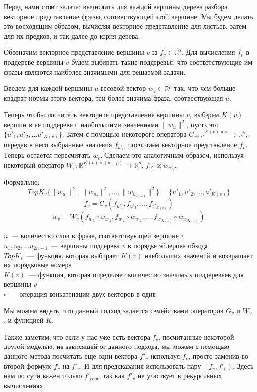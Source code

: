 Перед нами стоит задача: вычислить для каждой вершины дерева разбора 
векторное представление фразы, соотвествующей этой вершине.
Мы будем делать это восходящим образом, вычисляя векторное представление для листьев,
затем для их предков, и так далее до корня дерева.

Обозначим векторное представление вершины $v$ за $f_v \in \mathbb{R}^s$.
Для вычисления $f_v$ в поддереве вершины $v$ будем выбирать такие поддеревья, 
что соответствующие им фразы являются наиболее значимыми для решаемой задачи.

Введем для каждой вершины $u$ весовой вектор $w_u \in \mathbb{R}^p$  так, что
чем больше квадрат нормы  этого вектора, тем более значима фраза, соотвествующая $u$.

Теперь чтобы посчитать векторное представление вершины $v$, выберем $K(v)$ вершин
в ее поддереве с наибольшими значениями $\lVert w_u \rVert^2$, пусть это $\{ u'_1, u'_2, \dots u'_{K(v)} \}$.
Затем с помощью некоторого оператора $G_v:\mathbb{R}^{K(v) \times s} \to \mathbb{R}^s$, 
передав в него выбранные значения $f_{u'_i}$, посчитаем векторное представление $f_v$.
Теперь остается пересчитать $w_v$. Сделаем это аналогичным образом, используя некоторый оператор 
$W_v :\mathbb{R}^{K(v) \times (s + p)} \to \mathbb{R}^p$, $f_{u'_i}$ и $w_{u'_i}$.

Формально:
$$TopK_v \{ \lVert w_{u_1} \rVert^2, \lVert w_{u_2} \rVert^2, \dots, \lVert w_{u_{2n-1}} \rVert^2\} = \{u'_1, u'_2, \dots, u'_{K(v)}\}$$
$$f_v = G_v(f_{u'_1}, f_{u'_2}, \dots, f_{u'_{K(v)}})$$
$$w_v = W_v(f_{u'_1} \circ w_{u'_1},f_{u'_2} \circ w_{u'_2}, \dots, f_{u'_{K(v)}} \circ w_{u'_{K(v)}})$$

\noindent $n$~--- количество слов в фразе, соответствующей вершине $v$\\
$u_1, u_2, \dots u_{2n-1}$~--- вершины поддерева $v$ в порядке эйлерова обхода\\
$TopK_v$~--- функция, которая выбирает $K(v)$ наибольших значений и возвращает их порядковые номера\\
$K(v)$~--- функция, которая определяет количество значимых поддеревьев для вершины $v$\\
$\circ$~--- операция конкатенации двух векторов в один

Мы можем видеть, что данный подход задается семействами операторов $G_v$ и $W_v$, и функцией $K$.

Также заметим, что если у нас уже есть вектора $f_v$, посчитанные некоторой другой моделью, не зависящей от данного подхода,
мы можем с помощью данного метода посчитать еще одни вектора $f'_v$ используя $f_v$, просто заменив во второй формуле $f_v$ на $f'_v$. И для предсказания использовать пару $(f_v, f'_v)$. Здесь нам по сути важен только $f'_{root}$, так как $f'_v$ не участвует в рекурсивных вычислениях.

